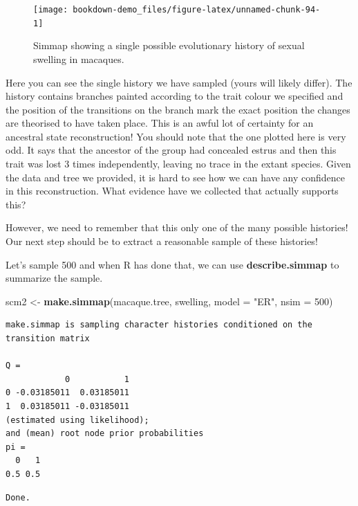 \documentclass[
]{book}
\newenvironment{Shaded}{\begin{snugshade}}{\end{snugshade}}
\newcommand{\DataTypeTok}[1]{\textcolor[rgb]{0.13,0.29,0.53}{#1}}
\newcommand{\DecValTok}[1]{\textcolor[rgb]{0.00,0.00,0.81}{#1}}
\newcommand{\KeywordTok}[1]{\textcolor[rgb]{0.13,0.29,0.53}{\textbf{#1}}}
\newcommand{\NormalTok}[1]{#1}
\newcommand{\StringTok}[1]{\textcolor[rgb]{0.31,0.60,0.02}{#1}}
\begin{document}
\begin{figure}[H]

{\centering \texttt{[image: bookdown-demo\_files/figure-latex/unnamed-chunk-94-1]} 

}

\caption{Simmap showing a single possible evolutionary history of sexual swelling in macaques.}\label{fig:unnamed-chunk-94}
\end{figure}

Here you can see the single history we have sampled (yours will likely differ). The history contains branches painted according to the trait colour we specified and the position of the transitions on the branch mark the exact position the changes are theorised to have taken place. This is an awful lot of certainty for an ancestral state reconstruction! You should note that the one plotted here is very odd. It says that the ancestor of the group had concealed estrus and then this trait was lost 3 times independently, leaving no trace in the extant species. Given the data and tree we provided, it is hard to see how we can have any confidence in this reconstruction. What evidence have we collected that actually supports this?

However, we need to remember that this only one of the many possible histories! Our next step should be to extract a reasonable sample of these histories!

Let's sample 500 and when R has done that, we can use \textbf{describe.simmap} to summarize the sample.

\begin{Shaded}
\begin{Highlighting}[]
\NormalTok{scm2 \textless{}{-}}\StringTok{ }\KeywordTok{make.simmap}\NormalTok{(macaque.tree, swelling, }\DataTypeTok{model =} \StringTok{"ER"}\NormalTok{, }\DataTypeTok{nsim =} \DecValTok{500}\NormalTok{)}
\end{Highlighting}
\end{Shaded}

\begin{verbatim}
make.simmap is sampling character histories conditioned on the transition matrix

Q =
            0           1
0 -0.03185011  0.03185011
1  0.03185011 -0.03185011
(estimated using likelihood);
and (mean) root node prior probabilities
pi =
  0   1 
0.5 0.5 
\end{verbatim}

\begin{verbatim}
Done.
\end{verbatim}
\end{document}
